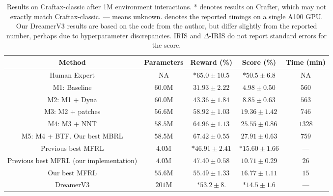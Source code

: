 \begin{table*}[btp]
\caption{Results on Craftax-classic after 1M environment interactions. 
* denotes results on Crafter,
which may not exactly match Craftax-classic.
--- means unknown.
\textdagger denotes the reported timings on a single A100 GPU.
Our DreamerV3 results are based
on the code from the author,
but differ slightly from the reported
number, perhaps due to 
hyperparameter discrepancies.
IRIS and $\Delta$-IRIS do not report standard errors for the score.
}
\label{tab:best_scores}
\small
\vspace{-.75em}
\centering
    \begin{tabular}{ccccc}
    \toprule
    Method & Parameters & Reward (\%) & Score (\%) & Time (min) \\
    \midrule
    Human Expert & NA & $*65.0 \pm 10.5$ & $*50.5 \pm 6.8$  & NA \\
    \midrule
    M1: Baseline
    & $60.0\text{M}$ & $31.93 \pm 2.22$ & $4.98 \pm 0.50$ & $560$ \\
    M2: M1 + Dyna
    & $60.0$M & $43.36 \pm 1.84$ & $8.85 \pm 0.63$ & $563$ \\
    M3: M2 + patches
    & $56.6$M & $58.92 \pm 1.03$ & $19.36 \pm 1.42$ & $746$ \\
    M4: M3 + NNT
    & $58.5$M & $64.96 \pm 1.13$ & $25.55 \pm 0.86$  & $1328$ \\
    M5: M4 + BTF. Our best MBRL
    & $58.5$M & $\mathbf{67.42} \pm 0.55$ & $\mathbf{27.91} \pm 0.63$ & $759$ \\
    \midrule
    Previous best MFRL \citep{moon2024discovering} 
    & $4.0\text{M}$
    & $*46.91 \pm 2.41$ 
    & $*15.60 \pm 1.66$
    & ---\\
    Previous best MFRL (our implementation) & $4.0\text{M}$ & $47.40 \pm 0.58$ & $10.71 \pm 0.29$ & $26$ \\
    Our best MFRL & $55.6$M & $55.49 \pm 1.33$  & $16.77 \pm 1.11$ & $15$\\
    \midrule
    DreamerV3 \citep{hafner2023mastering} & $201$M  & $*53.2 \pm 8.$ & $*14.5 \pm 1.6$ & --- \\

\end{tabular}
\end{table*}
